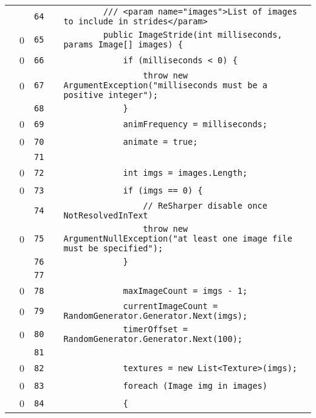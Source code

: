 \documentclass[a4paper,landscape,10pt]{article}
\begin{document}
\begin{longtable}[l]{lrrll}
\cellcolor{gray} &  & \verb~64~ & & \verb~        /// <param name="images">List of images to include in strides</param>~\\
\cellcolor{red} & 0 & \verb~65~ & & \verb~        public ImageStride(int milliseconds, params Image[] images) {~\\
\cellcolor{red} & 0 & \verb~66~ & & \verb~            if (milliseconds < 0) {~\\
\cellcolor{red} & 0 & \verb~67~ & & \verb~                throw new ArgumentException("milliseconds must be a positive integer");~\\
\cellcolor{gray} &  & \verb~68~ & & \verb~            }~\\
\cellcolor{red} & 0 & \verb~69~ & & \verb~            animFrequency = milliseconds;~\\
\cellcolor{red} & 0 & \verb~70~ & & \verb~            animate = true;~\\
\cellcolor{gray} &  & \verb~71~ & & \verb~~\\
\cellcolor{red} & 0 & \verb~72~ & & \verb~            int imgs = images.Length;~\\
\cellcolor{red} & 0 & \verb~73~ & & \verb~            if (imgs == 0) {~\\
\cellcolor{gray} &  & \verb~74~ & & \verb~                // ReSharper disable once NotResolvedInText~\\
\cellcolor{red} & 0 & \verb~75~ & & \verb~                throw new ArgumentNullException("at least one image file must be specified");~\\
\cellcolor{gray} &  & \verb~76~ & & \verb~            }~\\
\cellcolor{gray} &  & \verb~77~ & & \verb~~\\
\cellcolor{red} & 0 & \verb~78~ & & \verb~            maxImageCount = imgs - 1;~\\
\cellcolor{red} & 0 & \verb~79~ & & \verb~            currentImageCount = RandomGenerator.Generator.Next(imgs);~\\
\cellcolor{red} & 0 & \verb~80~ & & \verb~            timerOffset = RandomGenerator.Generator.Next(100);~\\
\cellcolor{gray} &  & \verb~81~ & & \verb~~\\
\cellcolor{red} & 0 & \verb~82~ & & \verb~            textures = new List<Texture>(imgs);~\\
\cellcolor{red} & 0 & \verb~83~ & & \verb~            foreach (Image img in images)~\\
\cellcolor{red} & 0 & \verb~84~ & & \verb~            {~\\

\end{longtable}
\end{document}
